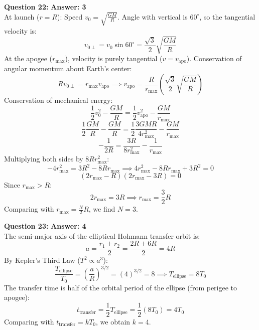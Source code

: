 \documentclass[11pt,a4paper]{article}
\begin{document}
\begin{tcolorbox}[solbox]
  \textbf{\textcolor{primaryDark}{Question 22:}} \hfill \textbf{\textcolor{l3Crimson}{Answer: 3}}\\
  \vspace{3pt}
  At launch ($r = R$):
Speed $v_0 = \sqrt{\frac{GM}{R}}$.
Angle with vertical is $60^\circ$, so the tangential velocity is:
$$v_{0\perp} = v_0\sin 60^\circ = \frac{\sqrt{3}}{2}\sqrt{\frac{GM}{R}}$$
\vspace{3pt}
At the apogee ($r_{\max}$), velocity is purely tangential ($v = v_{\text{apo}}$).
Conservation of angular momentum about Earth's center:
$$R v_{0\perp} = r_{\max} v_{\text{apo}} \implies v_{\text{apo}} = \frac{R}{r_{\max}}\left(\frac{\sqrt{3}}{2}\sqrt{\frac{GM}{R}}\right)$$
\vspace{3pt}
Conservation of mechanical energy:
$$\frac{1}{2}v_0^2 - \frac{GM}{R} = \frac{1}{2}v_{\text{apo}}^2 - \frac{GM}{r_{\max}}$$
$$\frac{1}{2}\frac{GM}{R} - \frac{GM}{R} = \frac{1}{2}\frac{3GMR}{4 r_{\max}^2} - \frac{GM}{r_{\max}}$$
$$-\frac{1}{2R} = \frac{3R}{8 r_{\max}^2} - \frac{1}{r_{\max}}$$
\vspace{3pt}
Multiplying both sides by $8R r_{\max}^2$:
$$-4 r_{\max}^2 = 3R^2 - 8R r_{\max} \implies 4 r_{\max}^2 - 8R r_{\max} + 3R^2 = 0$$
$$(2r_{\max} - R)(2r_{\max} - 3R) = 0$$
Since $r_{\max} > R$:
$$2r_{\max} = 3R \implies r_{\max} = \frac{3}{2}R$$
\vspace{3pt}
Comparing with $r_{\max} = \frac{N}{2}R$, we find $N = 3$.
\end{tcolorbox}
\vspace{3pt}

\begin{tcolorbox}[solbox]
  \textbf{\textcolor{primaryDark}{Question 23:}} \hfill \textbf{\textcolor{l3Crimson}{Answer: 4}}\\
  \vspace{3pt}
  The semi-major axis of the elliptical Hohmann transfer orbit is:
$$a = \frac{r_1 + r_2}{2} = \frac{2R + 6R}{2} = 4R$$
\vspace{3pt}
By Kepler's Third Law ($T^2 \propto a^3$):
$$\frac{T_{\text{ellipse}}}{T_0} = \left(\frac{a}{R}\right)^{3/2} = (4)^{3/2} = 8 \implies T_{\text{ellipse}} = 8 T_0$$
\vspace{3pt}
The transfer time is half of the orbital period of the ellipse (from perigee to apogee):
$$t_{\text{transfer}} = \frac{1}{2} T_{\text{ellipse}} = \frac{1}{2}(8 T_0) = 4 T_0$$
\vspace{3pt}
Comparing with $t_{\text{transfer}} = k T_0$, we obtain $k = 4$.
\end{tcolorbox}
\vspace{3pt}
\end{document}
